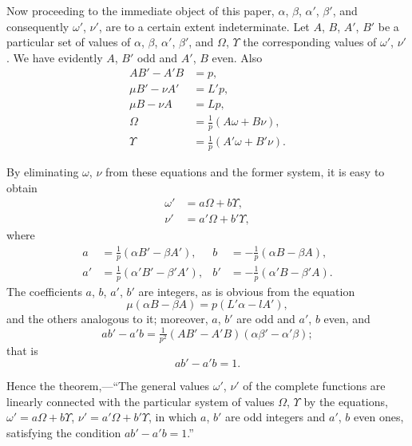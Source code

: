 \documentclass[12pt,a4paper]{article}
\begin{document}
Now proceeding to the immediate object of this paper, $\alpha$, $\beta$, $\alpha'$, $\beta'$, and consequently $\omega'$, $\nu'$, are to a certain extent indeterminate. Let $A$, $B$, $A'$, $B'$ be a particular set of values of $\alpha$, $\beta$, $\alpha'$, $\beta'$, and $\Omega$, $\Upsilon$ the corresponding values of $\omega'$, $\nu'$. We have evidently $A$, $B'$ odd and $A'$, $B$ even. Also
\begin{align*}
AB' - A'B &= p,\\
\mu B' - \nu A' &= L'p,\\
\mu B - \nu A &= Lp,\\
\Omega &= \tfrac{1}{p}(A\omega + B\nu),\\
\Upsilon &= \tfrac{1}{p}(A'\omega + B'\nu).
\end{align*}

\newpage
\setcounter{page}{134}

By eliminating $\omega$, $\nu$ from these equations and the former system, it is easy to obtain
\begin{align*}
\omega' &= a\Omega + b\Upsilon,\\
\nu' &= a'\Omega + b'\Upsilon,
\end{align*}
where
\begin{align*}
a &= \tfrac{1}{p}(\alpha B' - \beta A'), & b &= -\tfrac{1}{p}(\alpha B - \beta A),\\
a' &= \tfrac{1}{p}(\alpha' B' - \beta' A'), & b' &= -\tfrac{1}{p}(\alpha' B - \beta' A).
\end{align*}
The coefficients $a$, $b$, $a'$, $b'$ are integers, as is obvious from the equation
\[
\mu(\alpha B - \beta A) = p(L'\alpha - lA'),
\]
and the others analogous to it; moreover, $a$, $b'$ are odd and $a'$, $b$ even, and
\[
ab' - a'b = \tfrac{1}{p^2}(AB' - A'B)(\alpha\beta' - \alpha'\beta);
\]
that is
\[
ab' - a'b = 1.
\]

Hence the theorem,---``The general values $\omega'$, $\nu'$ of the complete functions are linearly connected with the particular system of values $\Omega$, $\Upsilon$ by the equations, $\omega' = a\Omega + b\Upsilon$, $\nu' = a'\Omega + b'\Upsilon$, in which $a$, $b'$ are odd integers and $a'$, $b$ even ones, satisfying the condition $ab' - a'b = 1$.''
\end{document}
